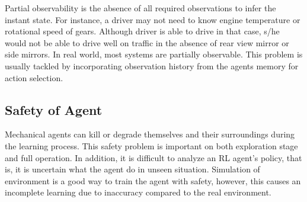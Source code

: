Partial observability is the absence of all required observations to infer the instant state. 
For instance, a driver may not need to know engine temperature or rotational speed of gears. 
Although driver is able to drive in that case, s/he would not be able to drive well on traffic in the absence of rear view mirror or side mirrors. 
In real world, most systems are partially observable. 
This problem is usually tackled by incorporating observation history from the agents memory for action selection. 

\subsection{Safety of Agent}

Mechanical agents can kill or degrade themselves and their surroundings during the learning process. 
This safety problem is important on both exploration stage and full operation. 
In addition, it is difficult to analyze an RL agent's policy, that is, it is uncertain what the agent do in unseen situation. 
Simulation of environment is a good way to train the agent with safety, however, this causes an incomplete learning due to inaccuracy compared to the real environment. 
